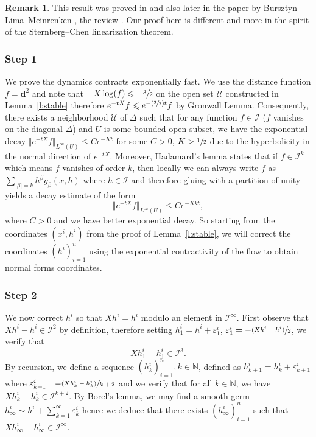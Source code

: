 \documentclass[JEP,XML,SOM,Unicode]{cedram}
\let\pazocal\mathscr
\newcommand{\Psfrac}[2]{(\sfrac{#1}{#2})}
\theoremstyle{definition}
\newtheorem{remark}[theorem]{Remark}
\let\euler X
\newcommand{\step}[1]{\subsubsection*{Step #1}}
\begin{document}
\begin{remark}
This result was proved in \cite{dangthesis} and also later
in the paper by Bursztyn--Lima--Meinrenken \cite{Bursztyn2019}, \cf the review \cite{Meinrenken2021}. Our proof here is different and more in the spirit of the Sternberg--Chen linearization theorem.
\end{remark}

\step{1}
We prove the dynamics contracts exponentially fast. We use the distance function $f=\mathbf{d}^2$ and note that
$-\euler \log(f)\leqslant -\sfrac{3}{2} $ on the open set $\pazocal{U}$ constructed in Lemma~\ref{l:stable} therefore
$ e^{-t\euler}f\leqslant e^{-\Psfrac{3}{2}t}f $ by Gronwall Lemma.
Consequently, there exists a neighborhood $\pazocal{U}$ of $\Delta$ such that for any function $f\in \pazocal{I}$ ($f$ vanishes on
the diagonal $\Delta$) and $U$ is some bounded open subset, we have the exponential decay
$\Vert e^{-t\euler}f\Vert_{L^\infty(U)} \leqslant C e^{-Kt}
$ for some $C>0$, $K>\sfrac{1}{2}$ due to the hyperbolicity
in the normal direction of $e^{-t\euler}$.
Moreover, Hadamard's lemma states that if $f\in \pazocal{I}^k$ which means $f$ vanishes of order $k$, then
locally we can always write
$f$ as $\sum_{\vert \beta\vert = k} h^\beta g_\beta(x,h) $
where $h\in \pazocal{I}$ and therefore gluing with a partition of unity
yields a decay estimate of the form
\[
\Vert e^{-t\euler}f\Vert_{L^\infty(U)} \leqslant C e^{-Kkt},
\]
where $C>0$ and we have better exponential decay.
So starting from the coordinates $(x^i,h^i)$ from {the proof of Lemma~\ref{l:stable}}, we will correct the coordinates
$(h^i)_{i=1}^n$ using the exponential contractivity of the flow
to obtain normal forms coordinates.

\step{2}
We now correct $h^i$ so that
$\euler h^i=h^i$ modulo an element in $\pazocal{I}^\infty$.
First observe that $\euler h^i-h^i\in \pazocal{I}^2$ by definition, therefore
setting $ h_1^i= h^i +\varepsilon^i_1$, $\varepsilon^i_1= -\sfrac{(\euler h^i-h^i)}{2} $, we verify that
\[
\euler h_1^i-h_1^i \in \pazocal{I}^3.
\]
By recursion, we define a sequence $(h_k^i)_{i=1}^n, k\in \mathbb{N}$,
defined as
$h_{k+1}^i=h_k^i+\varepsilon_{k+1}^i$
where $\varepsilon_{k+1}^i\!=\! -\sfrac{(\euler h^i_k-h^i_k)}{k+2} $
and we verify that for all $k\!\in\! \mathbb{N}$, we have $ \euler h_k^i-h_k^i \!\in\! \pazocal{I}^{k+2}$.
By Borel's lemma, we may find a smooth germ
$h_\infty^i\sim h^i + \sum_{k=1}^\infty \varepsilon_k^i $ hence we
deduce that there exists $(h_\infty^i)_{i=1}^n$ such that
$ \euler h_\infty^i-h_\infty^i \in \pazocal{I}^\infty $.
\end{document}
